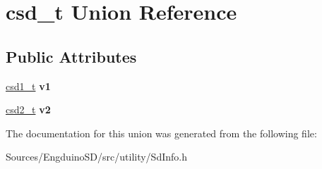 \hypertarget{unioncsd__t}{}\section{csd\+\_\+t Union Reference}
\label{unioncsd__t}
\subsection*{Public Attributes}
\begin{DoxyCompactItemize}
\item 
\hypertarget{unioncsd__t_acb1d09f122f32629d8d6faa9edcc943b}{}\hyperlink{struct_c_s_d_v1}{csd1\+\_\+t} {\bfseries v1}\label{unioncsd__t_acb1d09f122f32629d8d6faa9edcc943b}

\item 
\hypertarget{unioncsd__t_a19b60555856c9a485bcf4a84c248bfea}{}\hyperlink{struct_c_s_d_v2}{csd2\+\_\+t} {\bfseries v2}\label{unioncsd__t_a19b60555856c9a485bcf4a84c248bfea}

\end{DoxyCompactItemize}


The documentation for this union was generated from the following file\+:\begin{DoxyCompactItemize}
\item 
Sources/\+Engduino\+S\+D/src/utility/Sd\+Info.\+h\end{DoxyCompactItemize}
